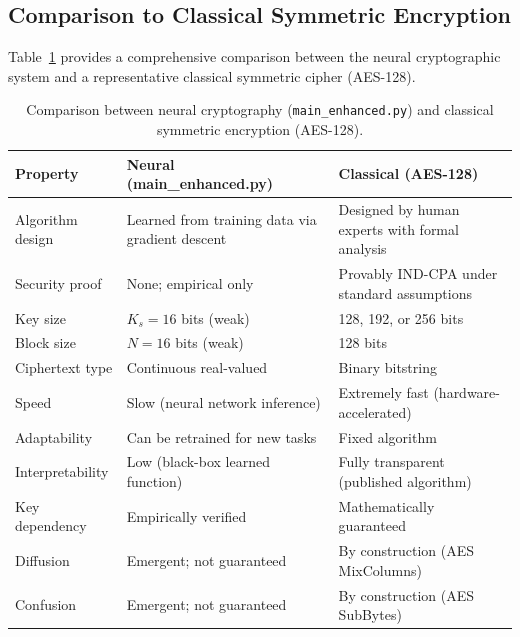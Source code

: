 \documentclass[12pt, a4paper]{article}
\newcommand{\code}[1]{\texttt{\color{CodeRed}#1}}
\begin{document}
\subsection{Comparison to Classical Symmetric Encryption}
\label{subsec:classical_comparison}

Table~\ref{tab:classical_vs_neural} provides a comprehensive comparison
between the neural cryptographic system and a representative classical
symmetric cipher (AES-128).

\begin{table}[H]
  \centering
  \caption{Comparison between neural cryptography (\code{main\_enhanced.py})
           and classical symmetric encryption (AES-128).}
  \label{tab:classical_vs_neural}
  \renewcommand{\arraystretch}{1.5}
  \begin{tabularx}{\linewidth}{@{} l X X @{}}
    \toprule
    \textbf{Property} & \textbf{Neural (main\_enhanced.py)} &
    \textbf{Classical (AES-128)} \\
    \midrule
    Algorithm design   &
      Learned from training data via gradient descent &
      Designed by human experts with formal analysis \\
    Security proof     &
      None; empirical only &
      Provably IND-CPA under standard assumptions \\
    Key size           &
      $K_s = 16$ bits (weak) &
      128, 192, or 256 bits \\
    Block size         &
      $N = 16$ bits (weak) &
      128 bits \\
    Ciphertext type    &
      Continuous real-valued &
      Binary bitstring \\
    Speed              &
      Slow (neural network inference) &
      Extremely fast (hardware-accelerated) \\
    Adaptability       &
      Can be retrained for new tasks &
      Fixed algorithm \\
    Interpretability   &
      Low (black-box learned function) &
      Fully transparent (published algorithm) \\
    Key dependency     &
      Empirically verified &
      Mathematically guaranteed \\
    Diffusion          &
      Emergent; not guaranteed &
      By construction (AES MixColumns) \\
    Confusion          &
      Emergent; not guaranteed &
      By construction (AES SubBytes) \\
    \bottomrule
  \end{tabularx}
\end{table}
\end{document}
